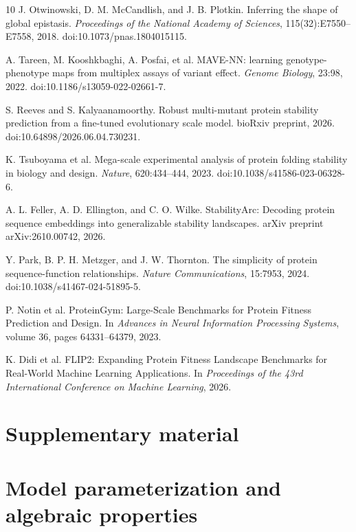 \documentclass{llncs}
\begin{document}
\begin{thebibliography}{10}
J. Otwinowski, D. M. McCandlish, and J. B. Plotkin.
\newblock Inferring the shape of global epistasis.
\newblock \emph{Proceedings of the National Academy of Sciences}, 115(32):E7550--E7558, 2018.
\newblock doi:10.1073/pnas.1804015115.

A. Tareen, M. Kooshkbaghi, A. Posfai, et al.
\newblock MAVE-NN: learning genotype-phenotype maps from multiplex assays of variant effect.
\newblock \emph{Genome Biology}, 23:98, 2022.
\newblock doi:10.1186/s13059-022-02661-7.

S. Reeves and S. Kalyaanamoorthy.
\newblock Robust multi-mutant protein stability prediction from a fine-tuned evolutionary scale model.
\newblock bioRxiv preprint, 2026.
\newblock doi:10.64898/2026.06.04.730231.

K. Tsuboyama et al.
\newblock Mega-scale experimental analysis of protein folding stability in biology and design.
\newblock \emph{Nature}, 620:434--444, 2023.
\newblock doi:10.1038/s41586-023-06328-6.

A. L. Feller, A. D. Ellington, and C. O. Wilke.
\newblock StabilityArc: Decoding protein sequence embeddings into generalizable stability landscapes.
\newblock arXiv preprint arXiv:2610.00742, 2026.

Y. Park, B. P. H. Metzger, and J. W. Thornton.
\newblock The simplicity of protein sequence-function relationships.
\newblock \emph{Nature Communications}, 15:7953, 2024.
\newblock doi:10.1038/s41467-024-51895-5.

P. Notin et al.
\newblock ProteinGym: Large-Scale Benchmarks for Protein Fitness Prediction and Design.
\newblock In \emph{Advances in Neural Information Processing Systems}, volume 36, pages 64331--64379, 2023.

K. Didi et al.
\newblock FLIP2: Expanding Protein Fitness Landscape Benchmarks for Real-World Machine Learning Applications.
\newblock In \emph{Proceedings of the 43rd International Conference on Machine Learning}, 2026.

\end{thebibliography}
\clearpage
{}
\renewcommand{\thepage}{S\arabic{page}}
\appendix
\section*{Supplementary material}
\section{Model parameterization and algebraic properties}
\label{app:parameterization}
\end{document}
